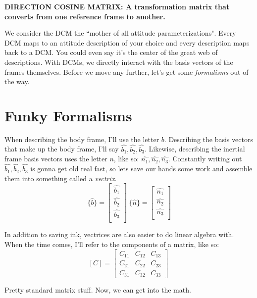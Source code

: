 \documentclass[a4paper,14pt]{extreport}
\newcommand{\bv}[1]{\hat{b_{#1}}}
\newcommand{\nv}[1]{\hat{n_{#1}}}
\begin{document}
\begin{center}
\textbf{DIRECTION COSINE MATRIX: A transformation matrix that converts from one reference frame to another.}
\end{center}

We consider the DCM the ``mother of all attitude parameterizations". Every DCM maps to an attitude description of your choice and every description maps back to a DCM. You could even say it's the center of the great web of descriptions. With DCMs, we directly interact with the basis vectors of the frames themselves. Before we move any further, let's get some \emph{formalisms} out of the way.
\section{Funky Formalisms}
When describing the body frame, I'll use the letter $b$. Describing the basis vectors that make up the body frame, I'll say $\bv{1}, \bv{2}, \bv{3}$. Likewise, describing the inertial frame basis vectors uses the letter $n$, like so: $\nv{1}, \nv{2}, \nv{3}$. Constantly writing out $\bv{1}, \bv{2}, \bv{3}$ is gonna get old real fast, so lets save our hands some work and assemble them into something called a \emph{vectrix}.
\[
\{\hat{b}\} = 
\begin{bmatrix}
\bv{1}\\ \bv{2}\\ \bv{3}\\
\end{bmatrix}\;
\{\hat{n}\} = 
\begin{bmatrix}
\nv{1}\\ \nv{2}\\ \nv{3}\\
\end{bmatrix}
\] 

In addition to saving ink, vectrices are also easier to do linear algebra with. When the time comes, I'll refer to the components of a matrix, like so:
\[
[C] = \begin{bmatrix}
C_{11}&C_{12}&C_{13}\\
C_{21}&C_{22}&C_{23}\\
C_{31}&C_{32}&C_{33}
\end{bmatrix}\
\]

Pretty standard matrix stuff. Now, we can get into the math.
\end{document}
